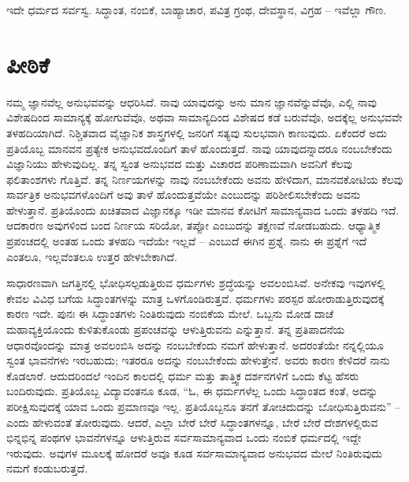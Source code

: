 \begin{center}
ಇದೇ ಧರ್ಮದ ಸರ್ವಸ್ವ. ಸಿದ್ಧಾಂತ, ನಂಬಿಕೆ, ಬಾಹ್ಯಾಚಾರ, ಪವಿತ್ರ ಗ್ರಂಥ, ದೇವಸ್ಥಾನ, ವಿಗ್ರಹ – ಇವೆಲ್ಲಾ ಗೌಣ.
\end{center}

\chapter{ಪೀಠಿಕೆ}

ನಮ್ಮ ಜ್ಞಾನವೆಲ್ಲ ಅನುಭವವನ್ನು ಆಧರಿಸಿದೆ. ನಾವು ಯಾವುದನ್ನು ಅನು ಮಾನ ಜ್ಞಾನವೆನ್ನುವೆವೊ, ಎಲ್ಲಿ ನಾವು ವಿಶೇಷದಿಂದ ಸಾಮಾನ್ಯಕ್ಕೆ ಹೋಗುವೆವೊ, ಅಥವಾ ಸಾಮಾನ್ಯದಿಂದ ವಿಶೇಷದ ಕಡೆ ಬರುವೆವೊ, ಅದಕ್ಕೆಲ್ಲ ಅನುಭವವೇ ತಳಹದಿಯಾಗಿದೆ. ನಿಶ್ಚಿತವಾದ ವೈಜ್ಞಾನಿಕ ಶಾಸ್ತ್ರಗಳಲ್ಲಿ ಜನರಿಗೆ ಸತ್ಯವು ಸುಲಭವಾಗಿ ಕಾಣುವುದು. ಏಕೆಂದರೆ ಅದು ಪ್ರತಿಯೊಬ್ಬ ಮಾನವನ ಪ್ರತ್ಯೇಕ ಅನುಭವದೊಂದಿಗೆ ತಾಳೆ ಹೊಂದುತ್ತದೆ. ನಾವು ಯಾವುದನ್ನಾದರೂ ನಂಬಬೇಕೆಂದು ವಿಜ್ಞಾನಿಯು ಹೇಳುವುದಿಲ್ಲ. ತನ್ನ ಸ್ವಂತ ಅನುಭವದ ಮತ್ತು ವಿಚಾರದ ಪರಿಣಾಮವಾಗಿ ಅವನಿಗೆ ಕೆಲವು ಫಲಿತಾಂಶಗಳು ಗೊತ್ತಿವೆ. ತನ್ನ ನಿರ್ಣಯಗಳನ್ನು ನಾವು ನಂಬಬೇಕೆಂದು ಅವನು ಹೇಳಿದಾಗ, ಮಾನವಕೋಟಿಯ ಕೆಲವು ಸಾರ್ವತ್ರಿಕ ಅನುಭವಗಳೊಂದಿಗೆ ಅವು ತಾಳೆ ಹೊಂದುತ್ತವೆಯೇ ಎಂಬುದನ್ನು ಪರಿಶೀಲಿಸಬೇಕೆಂದು ಅವನು ಹೇಳುತ್ತಾನೆ. ಪ್ರತಿಯೊಂದು ಖಚಿತವಾದ ವಿಜ್ಞಾನಕ್ಕೂ ಇಡೀ ಮಾನವ ಕೋಟಿಗೆ ಸಾಮಾನ್ಯವಾದ ಒಂದು ತಳಹದಿ ಇದೆ. ಆದಕಾರಣ ಅವುಗಳಿಂದ ಬಂದ ನಿರ್ಣಯ ಸರಿಯೋ, ತಪ್ಪೋ ಎಂಬುದನ್ನು ತಕ್ಷಣವೆ ನೋಡಬಹುದು. ಆಧ್ಯಾತ್ಮಿಕ ಪ್ರಪಂಚದಲ್ಲಿ ಅಂತಹ ಒಂದು ತಳಹದಿ ಇದೆಯೇ ಇಲ್ಲವೆ – ಎಂಬುದೆ ಈಗಿನ ಪ್ರಶ್ನೆ. ನಾನು ಈ ಪ್ರಶ್ನೆಗೆ ಇದೆ ಎಂತಲೂ, ಇಲ್ಲವೆಂತಲೂ ಉತ್ತರ ಹೇಳಬೇಕಾಗಿದೆ.

\vskip 5pt

ಸಾಧಾರಣವಾಗಿ ಜಗತ್ತಿನಲ್ಲಿ ಭೋಧಿಸಲ್ಪಡುತ್ತಿರುವ ಧರ್ಮಗಳು ಶ್ರದ್ಧೆಯನ್ನು ಅವಲಂಬಿಸಿವೆ. ಅನೇಕವು ಇವುಗಳಲ್ಲಿ ಕೇವಲ ವಿವಿಧ ಬಗೆಯ ಸಿದ್ಧಾಂತಗಳನ್ನು ಮಾತ್ರ ಒಳಗೊಂಡಿರುತ್ತವೆ. ಧರ್ಮಗಳು ಪರಸ್ಪರ ಹೋರಾಡುತ್ತಿರುವುದಕ್ಕೆ ಕಾರಣ ಇದೇ. ಪುನಃ ಈ ಸಿದ್ಧಾಂತಗಳು ನಿಂತಿರುವುದು ನಂಬಿಕೆಯ ಮೇಲೆ. ಒಬ್ಬನು ಮೋಡ ದಾಚೆ ಮಹಾವ್ಯಕ್ತಿಯೊಂದು ಕುಳಿತುಕೊಂಡು ಪ್ರಪಂಚವನ್ನು ಆಳುತ್ತಿರುವನು ಎನ್ನುತ್ತಾನೆ. ತನ್ನ ಪ್ರತಿಪಾದನೆಯ ಆಧಾರವೊಂದನ್ನು ಮಾತ್ರ ಅವಲಂಬಿಸಿ ಅದನ್ನು ನಂಬಬೇಕೆಂದು ನಮಗೆ ಹೇಳುತ್ತಾನೆ. ಅದರಂತೆಯೇ ನನ್ನಲ್ಲಿಯೂ ಸ್ವಂತ ಭಾವನೆಗಳು ಇರಬಹುದು; ಇತರರೂ ಅದನ್ನು ನಂಬಬೇಕೆಂದು ಹೇಳುತ್ತೇನೆ. ಅವರು ಕಾರಣ ಕೇಳಿದರೆ ನಾನು ಕೊಡಲಾರೆ. ಆದುದರಿಂದಲೆ ಇಂದಿನ ಕಾಲದಲ್ಲಿ ಧರ್ಮ ಮತ್ತು ತಾತ್ತ್ವಿಕ ದರ್ಶನಗಳಿಗೆ ಒಂದು ಕೆಟ್ಟ ಹೆಸರು ಬಂದಿರುವುದು. ಪ್ರತಿಯೊಬ್ಬ ವಿದ್ಯಾವಂತನೂ ಕೂಡ, “ಓ, ಈ ಧರ್ಮಗಳೆಲ್ಲ ಒಂದು ಸಿದ್ಧಾಂತದ ಕಂತೆ, ಅದನ್ನು ಪರೀಕ್ಷಿಸುವುದಕ್ಕೆ ಯಾವ ಒಂದು ಪ್ರಮಾಣವೂ ಇಲ್ಲ. ಪ್ರತಿಯೊಬ್ಬನೂ ತನಗೆ ತೋಚಿದುದನ್ನು ಬೋಧಿಸುತ್ತಿರುವನು” – ಎಂದು ಹೇಳುವಂತೆ ತೋರುವುದು. ಆದರೆ, ಎಲ್ಲಾ ಬೇರೆ ಬೇರೆ ಸಿದ್ಧಾಂತಗಳನ್ನೂ, ಬೇರೆ ಬೇರೆ ದೇಶಗಳಲ್ಲಿರುವ ಭಿನ್ನಭಿನ್ನ ಪಂಥಗಳ ಭಾವನೆಗಳನ್ನೂ ಆಳುತ್ತಿರುವ ಸರ್ವಸಾಮಾನ್ಯವಾದ ಒಂದು ನಂಬಿಕೆ ಧರ್ಮದಲ್ಲಿ ಇದ್ದೇ ಇರುವುದು. ಅವುಗಳ ಮೂಲಕ್ಕೆ ಹೋದರೆ ಅವೂ ಕೂಡ ಸರ್ವಸಾಮಾನ್ಯವಾದ ಅನುಭವದ ಮೇಲೆ ನಿಂತಿರುವುದು ನಮಗೆ ಕಂಡುಬರುತ್ತದೆ. 

\vskip 5pt

